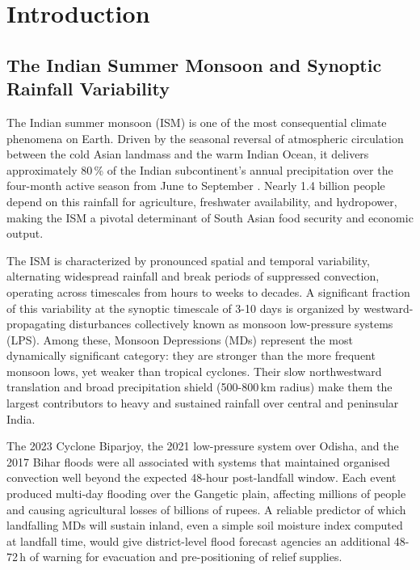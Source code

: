 \ifpdf
\graphicspath{{Chapter1/Figs/Raster/}{Chapter1/Figs/PDF/}{Chapter1/Figs/}}
\else
\graphicspath{{Chapter1/Figs/Vector/}{Chapter1/Figs/}}
\fi

\chapter{Introduction}
\label{ch:introduction}

\section{The Indian Summer Monsoon and Synoptic Rainfall Variability}
\label{sec:intro_ism}

The Indian summer monsoon (ISM) is one of the most consequential
climate phenomena on Earth. Driven by the seasonal reversal of
atmospheric circulation between the cold Asian landmass and the warm
Indian Ocean, it delivers approximately 80\,\% of the Indian
subcontinent's annual precipitation over the four-month active season
from June to September \citep{ding1994monsoon}. Nearly 1.4 billion
people depend on this rainfall for agriculture, freshwater
availability, and hydropower, making the ISM a pivotal determinant of
South Asian food security and economic output.

The ISM is characterized by pronounced spatial and temporal
variability, alternating widespread rainfall and break periods
of suppressed convection, operating across timescales from hours to
weeks to decades. A significant fraction of this variability at the
synoptic timescale of 3-10 days is organized by westward-propagating
disturbances collectively known as monsoon low-pressure systems (LPS).
Among these, Monsoon Depressions (MDs) represent the most dynamically
significant category: they are stronger than the more frequent monsoon
lows, yet weaker than tropical cyclones. Their slow northwestward
translation and broad precipitation shield (500-800\,km radius) make
them the largest contributors to heavy and sustained rainfall over
central and peninsular India.

The 2023 Cyclone Biparjoy, the 2021 low-pressure system over Odisha,
and the 2017 Bihar floods were all associated with systems that
maintained organised convection well beyond the expected 48-hour
post-landfall window. Each event produced multi-day flooding over the
Gangetic plain, affecting millions of people and causing agricultural
losses of billions of rupees. A reliable predictor of which
landfalling MDs will sustain inland, even a simple soil moisture
index computed at landfall time, would give district-level flood
forecast agencies an additional 48-72\,h of warning for evacuation
and pre-positioning of relief supplies.

